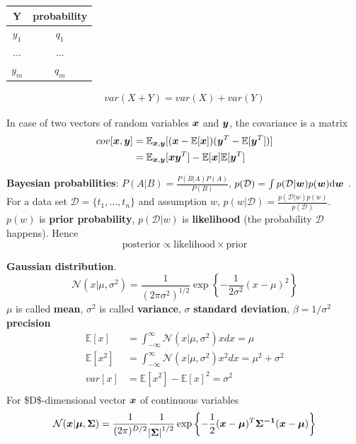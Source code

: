 \documentclass[11pt]{article}
\begin{document}
\begin{center}
\begin{tabular}{c|c}
Y & probability\\
\hline
\(y_1\) & \(q_1\)\\
\(\dots\) & \(\dots\)\\
\(y_m\) & \(q_m\)\\
\end{tabular}
\end{center}
\begin{align*}
var(X+Y)=var(X)+var(Y)
\end{align*}

In case of two vectors of random variables \(\boldsymbol{x}\) and \(\boldsymbol{y}\), the
covariance is a matrix
\begin{align*}
cov[\boldsymbol{x},\boldsymbol{y}]&=\mathbb{E}_{\boldsymbol{x},\boldsymbol{y}}[(\boldsymbol{x}-\mathbb{E}[\boldsymbol{x}])(\boldsymbol{y}^T
-\mathbb{E}[\boldsymbol{y}^T])]\\
&=\mathbb{E}_{\boldsymbol{x},\boldsymbol{y}}[\boldsymbol{xy}^T]-\mathbb{E}[\boldsymbol{x}]\mathbb{E}[\boldsymbol{y}^T]
\end{align*}

\textbf{Bayesian probabilities}: \(P(A|B)=\frac{P(B|A)P(A)}{P(B)}\),
\(p(\mathcal{D})=\int p(\mathcal{D}|\boldsymbol{w})p(\boldsymbol{w})\text{d}\boldsymbol{w}\)
. For a data set 
\(\mathcal{D}=\{t_1,\dots,t_n\}\) and assumption \(w\),
\(p(w|\mathcal{D})=\frac{p(\mathcal{D}|w)p(w)}{p(\mathcal{D})}\). \(p(w)\) is
\textbf{prior probability}, \(p(\mathcal{D}|w)\) is \textbf{likelihood} (the probability
\(\mathcal{D}\) happens). Hence 
\begin{equation*}
\text{posterior}\propto\text{likelihood}\times\text{prior}
\end{equation*}

\textbf{Gaussian distribution}.
\begin{equation*}
\mathcal{N}(x|\mu,\sigma^2)=\frac{1}{(2\pi\sigma^2)^{1/2}}\exp\left\{
-\frac{1}{2\sigma^2}(x-\mu)^2\right\}
\end{equation*}
\(\mu\) is called \textbf{mean}, \(\sigma^2\) is called \textbf{variance}, \(\sigma\) \textbf{standard
deviation}, \(\beta=1/\sigma^2\) \textbf{precision}
\begin{align*}
\mathbb{E}[x]&=\int_{-\infty}^\infty\mathcal{N}(x|\mu,\sigma^2)xdx=\mu\\
\mathbb{E}[x^2]&=\int_{-\infty}^\infty\mathcal{N}(x|\mu,\sigma^2)x^2dx=\mu^2
+\sigma^2\\
var[x]&=\mathbb{E}[x^2]-\mathbb{E}[x]^2=\sigma^2\\
\end{align*}
For \$D\$-dimensional vector \(\boldsymbol{x}\) of continuous variables
\begin{equation*}
\mathcal{N}(\boldsymbol{x}|\boldsymbol{\mu},\boldsymbol{\Sigma})=\frac{1}{(2\pi)^{D/2}}\frac{1}
{\abs{\boldsymbol{\Sigma}}^{1/2}}\exp\left\{-\frac{1}{2}(\boldsymbol{x}-\boldsymbol{\mu})^T
\boldsymbol{\Sigma^{-1}}(\boldsymbol{x}-\boldsymbol{\mu})\right\}
\end{equation*}
\end{document}
